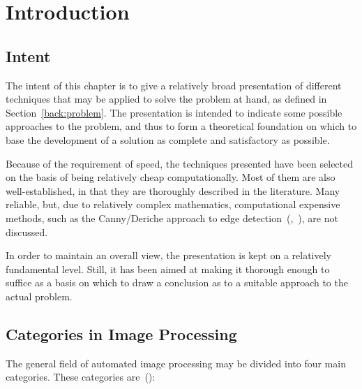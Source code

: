 
\section{Introduction}
\label{image:intro}

\subsection{Intent}
\label{image:intro:intent}

The intent of this chapter is to give a relatively broad presentation
of different techniques that may be applied to solve the problem at
hand, as defined in Section~\ref{back:problem}.  The presentation is
intended to indicate some possible approaches to the problem, and thus
to form a theoretical foundation on which to base the development of a
solution as complete and satisfactory as possible.

Because of the requirement of speed, the techniques presented have
been selected on the basis of being relatively cheap computationally.
Most of them are also well-established, in that they are thoroughly
described in the literature.  Many reliable, but, due to relatively
complex mathematics, computational expensive methods, such as the
Canny/Deriche approach to edge
detection~(\cite{canny},~\cite{deriche}), are not discussed.

In order to maintain an overall view, the presentation is kept on a
relatively fundamental level.  Still, it has been aimed at making it
thorough enough to suffice as a basis on which to draw a conclusion
as to a suitable approach to the actual problem.

\subsection{Categories in Image Processing}
\label{image:intro:categories}

The general field of automated image processing may be divided into
four main categories.  These categories are~(\cite{digim}):

